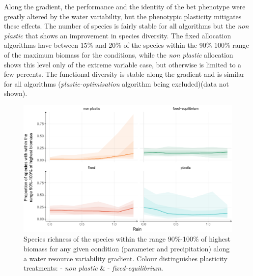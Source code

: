 

Along the gradient, the performance and the identity of the bet phenotype were greatly altered by the water variability, but the phenotypic plasticity mitigates these effects. The number of species is fairly stable for all algorithms but the \textit{non plastic} that shows an improvement in species diversity. The fixed allocation algorithms have between 15\% and 20\% of the species within the 90\%-100\% range of the maximum biomass for the conditions, while the \textit{non plastic} allocation shows this level only of the extreme variable case, but otherwise is limited to a few percents. The functional diversity is stable along the gradient and is similar for all algorithms (\textit{plastic-optimisation} algorithm being excluded)(data not shown).

\begin{figure}\label{fig:variable}
\includegraphics[width = \textwidth]{./2_PP/Figures/Variable/var_spdiv_trend.pdf}
\caption[Species richness of the best performing species along a water resource variability gradient]{Species richness of the species within the range 90\%-100\% of highest biomass for any given condition (parameter and precipitation) along a water resource variability gradient.  Colour distinguishes plasticity treatments: \textcolor{myOrange}{- \textit{non plastic}} \&  \textcolor{myGreen}{- \textit{fixed-equilibrium}}.}
\end{figure}

